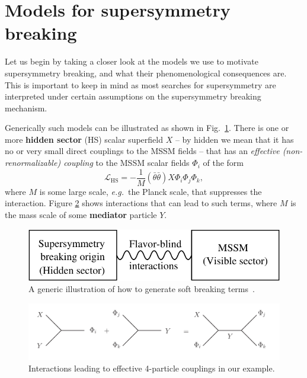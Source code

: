 \documentclass[notes.tex]{subfiles}
\begin{document}
\section{Models for supersymmetry breaking} 
Let us begin by taking a closer look at the models we use to motivate supersymmetry breaking, and what their phenomenological consequences are. This is important to keep in mind as most searches for supersymmetry are interpreted under certain assumptions on the supersymmetry  breaking mechanism.

Generically such models can be illustrated as shown in Fig.~\ref{SSB}. There is one or more {\bf hidden sector} (HS) scalar superfield $X$ -- by hidden we mean that it has no or very small direct couplings to the MSSM fields -- that has an {\it effective (non-renormalizable) coupling} to the MSSM scalar fields $\Phi_i$ of the form
\begin{equation}
\mathcal{L}_\text{HS} = -\frac{1}{M}(\bar\theta\bar\theta)X\Phi_i\Phi_j\Phi_k,
\label{eq:HS_MSSM}
\end{equation}
where $M$ is some large scale, {\it e.g.}\ the Planck scale, that suppresses the interaction. Figure \ref{SUSYB} shows interactions that can lead to such terms, where $M$ is the mass scale of some {\bf mediator} particle $Y$. 

\begin{figure}[h!]
\centering
\includegraphics[scale=1.0]{figures/structure} 
\caption{A generic illustration of how to generate soft breaking terms~\cite{Martin:1997ns}. \label{SSB}}
\end{figure}

\begin{figure}[h!]
\begin{center}
\includegraphics[scale=0.9]{figures/SUSYB} 
\caption{Interactions leading to effective 4-particle couplings in our example. \label{SUSYB}}
\end{center}
\end{figure}
\end{document}
